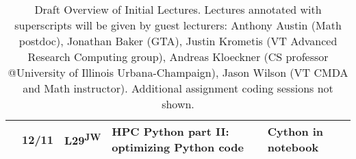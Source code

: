 \begin{table}[htbp!]
\begin{tabular}{l|l|l||l|l}
  \parbox[t]{2mm}{} & 12/11 & L29\textsuperscript{JW} & HPC Python part II: optimizing Python code & Cython in notebook \\
  \hline
    \end{tabular}
    \caption{Draft Overview of Initial Lectures. Lectures annotated with superscripts will be given by guest lecturers:  Anthony Austin (Math postdoc),  Jonathan Baker (GTA),  Justin Krometis (VT Advanced Research Computing group), Andreas Kloeckner (CS professor @University of Illinois Urbana-Champaign), Jason Wilson (VT CMDA and Math instructor). Additional assignment coding sessions not shown.}
    \label{schedule.tab}
\end{table}
\normalsize

